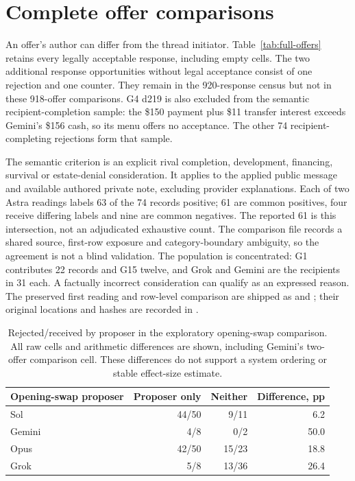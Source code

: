 \section{Complete offer comparisons}
\label{app:comparisons}
An offer's author can differ from the thread initiator. Table~\ref{tab:full-offers} retains every legally acceptable response, including empty cells. The two additional response opportunities without legal acceptance consist of one rejection and one counter. They remain in the 920-response census but not in these 918-offer comparisons.
G4 d219 is also excluded from the semantic recipient-completion sample: the \$150 payment plus \$11 transfer interest exceeds Gemini's \$156 cash, so its menu offers no acceptance. The other 74 recipient-completing rejections form that sample.

The semantic criterion is an explicit rival completion, development, financing, survival or estate-denial consideration. It applies to the applied public message and available authored private note, excluding provider explanations. Each of two Astra readings labels 63 of the 74 records positive; 61 are common positives, four receive differing labels and nine are common negatives. The reported 61 is this intersection, not an adjudicated exhaustive count. The comparison file records a shared source, first-row exposure and category-boundary ambiguity, so the agreement is not a blind validation. The population is concentrated: G1 contributes 22 records and G15 twelve, and Grok and Gemini are the recipients in 31 each. A factually incorrect consideration can qualify as an expressed reason. The preserved first reading and row-level comparison are shipped as  and ; their original locations and hashes are recorded in .


\begin{table}[ht]\centering
\begin{tabular}{@{}lrrr@{}}\toprule
Opening-swap proposer & Proposer only & Neither & Difference, pp\\\midrule
Sol &44/50&9/11&6.2\\
Gemini &4/8&0/2&50.0\\
Opus &42/50&15/23&18.8\\
Grok &5/8&13/36&26.4\\\bottomrule
\end{tabular}
\caption{Rejected/received by proposer in the exploratory opening-swap comparison. All raw cells and arithmetic differences are shown, including Gemini's two-offer comparison cell. These differences do not support a system ordering or stable effect-size estimate.}\label{tab:proposer}
\end{table}

